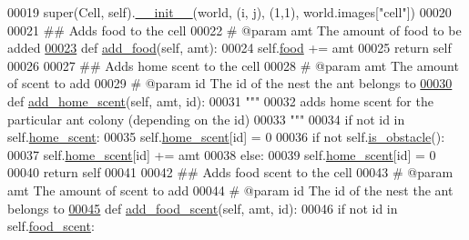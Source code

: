 \begin{DoxyCode}
00019         super(Cell, self).\hyperlink{classworld_1_1Cell_a3dd387b6af13f7450acb97fb40c13a0e}{\_\_init\_\_}(world, (i, j), (1,1), world.images[\textcolor{stringliteral}{"cell"}])
00020 
00021     \textcolor{comment}{## Adds food to the cell}
00022     \textcolor{comment}{# @param amt The amount of food to be added}
\hypertarget{world_8py_source_l00023}{}\hyperlink{classworld_1_1Cell_a3d9725f56b584acd9f75728f364975b0}{00023}     \textcolor{keyword}{def }\hyperlink{classworld_1_1Cell_a3d9725f56b584acd9f75728f364975b0}{add\_food}(self, amt):
00024         self.\hyperlink{classworld_1_1Cell_a401fde7236825c1843dad8764c2fb4a8}{food} += amt
00025         \textcolor{keywordflow}{return} self
00026 
00027     \textcolor{comment}{## Adds home scent to the cell}
00028     \textcolor{comment}{# @param amt The amount of scent to add}
00029     \textcolor{comment}{# @param id The id of the nest the ant belongs to}
\hypertarget{world_8py_source_l00030}{}\hyperlink{classworld_1_1Cell_a52af74786918c6c3f4d1d0b0f44aecb8}{00030}     \textcolor{keyword}{def }\hyperlink{classworld_1_1Cell_a52af74786918c6c3f4d1d0b0f44aecb8}{add\_home\_scent}(self, amt, id):
00031         \textcolor{stringliteral}{"""}
00032 \textcolor{stringliteral}{        adds home scent for the particular ant colony (depending on the id)}
00033 \textcolor{stringliteral}{        """}
00034         \textcolor{keywordflow}{if} \textcolor{keywordflow}{not} id \textcolor{keywordflow}{in} self.\hyperlink{classworld_1_1Cell_a0ef4adaadea1ccdcd1b61c70e242aa4a}{home\_scent}:
00035             self.\hyperlink{classworld_1_1Cell_a0ef4adaadea1ccdcd1b61c70e242aa4a}{home\_scent}[id] = 0
00036         \textcolor{keywordflow}{if} \textcolor{keywordflow}{not} self.\hyperlink{classworld_1_1Cell_a890e2dc899a32ef86c131a98879e9023}{is\_obstacle}():
00037             self.\hyperlink{classworld_1_1Cell_a0ef4adaadea1ccdcd1b61c70e242aa4a}{home\_scent}[id] += amt
00038         \textcolor{keywordflow}{else}:
00039             self.\hyperlink{classworld_1_1Cell_a0ef4adaadea1ccdcd1b61c70e242aa4a}{home\_scent}[id] = 0
00040         \textcolor{keywordflow}{return} self
00041 
00042     \textcolor{comment}{## Adds food scent to the cell}
00043     \textcolor{comment}{# @param amt The amount of scent to add}
00044     \textcolor{comment}{# @param id The id of the nest the ant belongs to}
\hypertarget{world_8py_source_l00045}{}\hyperlink{classworld_1_1Cell_a773c26b2353ffaede745ee726d2e256d}{00045}     \textcolor{keyword}{def }\hyperlink{classworld_1_1Cell_a773c26b2353ffaede745ee726d2e256d}{add\_food\_scent}(self, amt, id):
00046         \textcolor{keywordflow}{if} \textcolor{keywordflow}{not} id \textcolor{keywordflow}{in} self.\hyperlink{classworld_1_1Cell_acec0cb9d8a7eb92bedf71dc57641efbe}{food\_scent}:

\end{DoxyCode}
